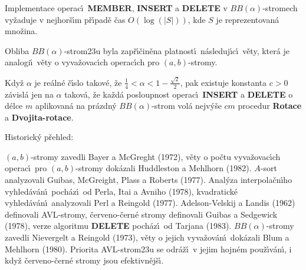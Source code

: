 \documentclass[a4paper,12pt]{article}
\begin{document}
Implementace operac\'\i\ {\bf MEMBER}, {\bf INSERT} a {\bf DELETE }v $BB(\alpha )$-stromech vy\v zaduje v nejhor\v s\'\i m 
p\v r\'\i pad\v e \v cas $O(\log(|S|))$, kde $S$ je 
reprezentovan\'a mno\v zina.
\endproclaim

\flushpar Obliba $BB(\alpha )$-strom\accent23u byla zap\v r\'\i\v cin\v ena 
platnost\'\i\ n\'asleduj\'\i c\'\i\ v\v ety, kter\'a je analogi\'\i\ v\v ety o 
vyva\v zovac\'\i ch operac\'\i ch pro $(a,b)$-stromy.

Kdy\v z $\alpha$ je re\'aln\'e \v c\'\i slo takov\'e, \v ze 
$\frac 14<\alpha <1-\frac {\sqrt 2}2$, pak existuje konstanta $c>
0$ z\'avisl\'a jen na 
$\alpha$ takov\'a, \v ze ka\v zd\'a posloupnost operac\'\i\ {\bf INSERT} a {\bf DELETE }
o d\'elce $m$ aplikovan\'a na pr\'azdn\'y $BB(\alpha )$-strom vol\'a 
nejv\'y\v se $cm$ procedur {\bf Rotace} a {\bf Dvojita-rotace}.
\endproclaim

\heading
Historick\'y p\v rehled:
\endheading

$(a,b)$-stromy zavedli Bayer a McGreght (1972),\newline 
v\v ety o po\v ctu vyva\v zovac\'\i ch operac\'\i\ pro $(a,b)$-stromy dok\'azali 
Huddleston a Mehlhorn (1982).\newline 
$A$-sort analyzovali Guibas, McGreight, Plass a Roberts (1977).
\smallskip
\flushpar Anal\'yza interpola\v cn\'\i ho vyhled\'av\'an\'\i\ poch\'az\'\i\ od Perla, 
Itai a Avniho (1978),\newline 
kvadratick\'e vyhled\'av\'an\'\i\ analyzovali Perl a Reingold (1977).
\smallskip
\flushpar Adelson-Velskij a Landis (1962) definovali 
AVL-stromy,\newline 
\v cerveno-\v cern\'e stromy definovali Guibas a Sedgewick 
(1978),\newline 
verze algoritmu {\bf DELETE} poch\'az\'\i\ od Tarjana (1983).
$BB(\alpha )$-stromy zavedli Nievergelt a Reingold (1973),\newline 
v\v ety o jejich vyva\v zov\'an\'\i\ dok\'azali Blum a Mehlhorn (1980).\newline 
Priorita AVL-strom\accent23u se odr\'a\v z\'\i\ v 
jejim hojn\'em pou\v z\'\i v\'an\'\i , i kdy\v z \v cerveno-\v cern\'e stromy 
jsou efektivn\v ej\v s\'\i . 
\end{document}
